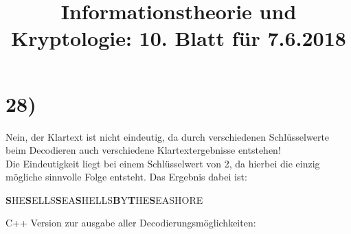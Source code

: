 %



  \title{Informationstheorie und Kryptologie: 10. Blatt für 7.6.2018}
  \maketitle

  \section*{28)}
  
    Nein, der Klartext ist nicht eindeutig, da durch verschiedenen Schlüsselwerte beim Decodieren auch verschiedene Klartextergebnisse entstehen!\\
    \newline
    Die Eindeutigkeit liegt bei einem Schlüsselwert von 2, da hierbei die einzig mögliche sinnvolle Folge entsteht. Das Ergebnis dabei ist:
    \begin{center}
    	\textbf{S}HE\textbf{S}ELLS\textbf{S}EA\textbf{S}HELLS\textbf{B}Y\textbf{T}HE\textbf{S}EASHORE
    \end{center}
    C++ Version zur ausgabe aller Decodierungsmöglichkeiten:\\
       
  
